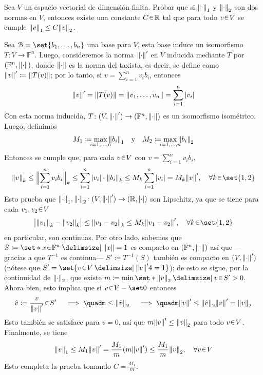 \begin{ejer}
Sea $V$ un espacio vectorial de dimensión finita. Probar que si $\norm{\cdot}_1$ y $\norm{\cdot}_2$ son dos normas en $V$, entonces existe una constante $C \en \mathbb{R}$ tal que para todo $v \en V$ se cumple $\norm{v}_1 \leq C \norm{v}_2$.
\end{ejer}
\begin{sol}[Demostración]
Sea $\mathcal{B} = \set{b_1,\dots,b_n}$ una base para $V$, esta base induce un isomorfismo $T \colon V \to \mathbb{F}^n$. Luego, consideremos la norma $\norm{\cdot}'$ en $V$ inducida mediante $T$ por $(\mathbb{F}^n, \norm{\cdot})$, donde $\norm{\cdot}$ es la norma del taxista, es decir, se define como $\norm{v}' \coloneq \norm{T(v)}$; por lo tanto, si $v = \sum^n_{i=1}v_ib_i$, entonces 
\[
\norm{v}' = \norm{T(v)} = \norm{v_1,\dots,v_n} = \sum^n_{i=1} \abs{v_i}
\]
Con esta norma inducida, $T \colon (V,\norm{\cdot}') \to (\mathbb{F}^n,\norm{\cdot})$ es un isomorfismo isométrico. Luego, definimos
\[
M_1 \coloneq \max_{\mathclap{i=1,\dots,n}} \norm{b_i}_1%
\quad\text{y}\quad
M_2 \coloneq \max_{\mathclap{i=1,\dots,n}} \norm{b_i}_2%
\]
Entonces se cumple que, para cada $v \en V$ con $v = \sum^n_{i=1} v_ib_i$,
\[
\norm{v}_k%
\leq \norm\Big{\sum^{n}_{i=1} v_ib_i}{\vphantom{\sum}}_k%
\leq \sum^n_{i=1} \abs{v_i}\cdot\norm{b_i}_k%
\leq M_k \sum^n_{i=1} \abs{v_i}%
= M_k \norm{v}',
\quad\forall k\en\set{1,2}
\]
Esto prueba que $\norm{\cdot}_1,\norm{\cdot}_2 \colon (V,\norm{\cdot}') \to (\mathbb{R},\abs{\cdot})$ son Lipschitz, ya que se tiene para cada $v_1,v_2 \en V$
\[
\abs\big{\norm{v_1}_k - \norm{v_2}_k}%
\leq \norm{v_1 - v_2}_k%
\leq M_k \norm{v_1-v_2}',%
\quad\forall k\en\set{1,2}
\]
en particular, son continuas. Por otro lado, sabemos que $S \coloneq \set*{x \en \mathbb{F}^n \given \norm{x} = 1}$ es compacto en $(\mathbb{F}^n,\norm{\cdot})$ así que ---gracias a que $T^{-1}$ es continua--- $S' \coloneq T^{-1}(S)$ también es compacto en $(V, \norm{\cdot}')$ (nótese que $S' = \set{v \en V \given \norm{v}'4 = 1}$); de esto se sigue, por la continuidad de $\norm{\cdot}_2$, que existe $m \coloneq \min\set*{\norm{v}_2 \given v \en S'} > 0$. Ahora bien, esto implica que si $v \en V-\set0$ entonces 
\[
\hat{v} \coloneq \frac{v}{\norm{v}'} \en S'%
\quad\implies\quad%
m \leq \norm{\hat{v}}_2%
\quad\implies\quad%
m\norm{v}' \leq \norm{\hat{v}}_2\norm{v}' = \norm{v}_2
\]
Esto también se satisface para $v=0$, así que $m\norm{v}' \leq \norm{v}_2$ para todo $v \en V$. Finalmente, se tiene
\[
\norm{v}_1 \leq M_1\norm{v}' = \frac{M_1}{m}(m\norm{v}') \leq \frac{M_1}{m} \norm{v}_2,
\quad\forall v \en V
\]
Esto completa la prueba tomando $C = \frac{M_1}{m}$.
\end{sol}

